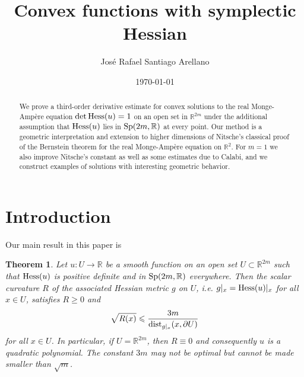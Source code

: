\documentclass[11pt,reqno]{amsart}
\renewcommand{\leq}{\leqslant}
\renewcommand{\geq}{\geqslant}
\theoremstyle{plain}
\newtheorem{theorem}{Theorem}[section]
\theoremstyle{definition}
\numberwithin{equation}{section}
\begin{document}
	
\title{Convex functions with symplectic Hessian}
	
\begin{abstract}
We prove a third-order derivative estimate for convex solutions to the real Monge-Ampère equation ${\rm det}\,{\rm Hess}(u) = 1$ on an open set in $\mathbb{R}^{2m}$ under the additional assumption that ${\rm Hess}(u)$ lies in ${\rm Sp}(2m,\mathbb{R})$ at every point. Our method is a geometric interpretation and extension to higher dimensions of Nitsche's classical proof of the Bernstein theorem for the real Monge-Ampère equation on $\mathbb{R}^2$. For $m = 1$ we also improve Nitsche's constant as well as some estimates due to Calabi, and we construct examples of solutions with interesting geometric behavior.
\end{abstract}
	
\author{José Rafael Santiago Arellano}
\address{Mathematisches Institut, Universit\"at M\"unster, 48149 M\"unster, Germany}

\date{\today}
	
\maketitle
	

\section{Introduction}

Our main result in this paper is

\begin{theorem}\label{thm:main}
Let $u: U \to \mathbb{R}$ be a smooth function on an open set $U \subset \mathbb{R}^{2m}$ such that ${\rm Hess}(u)$ is positive definite and in ${\rm Sp}(2m,\mathbb{R})$ everywhere. Then the scalar curvature $R$ of the associated Hessian metric $g$ on $U$, i.e. $g|_x = {\rm Hess}(u)|_x$ for all $x \in U$, satisfies $R \geq 0$ and
\begin{equation}\label{eq:main_est}\sqrt{R(x)} \leq \frac{3m}{{\rm dist}_{g|_x}(x,\partial U)}\end{equation}
for all $x \in U$. In particular, if $U = \mathbb{R}^{2m}$, then $R \equiv 0$ and consequently $u$ is a quadratic polynomial. The constant $3m$ may not be optimal but cannot be made smaller than $\sqrt{m}$.
\end{theorem}
\end{document}
